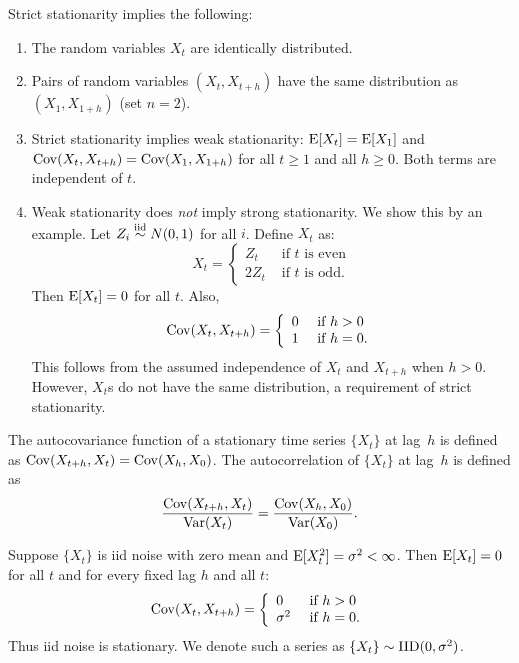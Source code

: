 Strict stationarity implies the following:
\begin{enumerate}
\item The random variables $X_t$ are identically distributed.
	
	\item Pairs of random variables $(X_t, X_{t + h})$ have the same
distribution as $(X_1, X_{1 + h})$ (set $n = 2$).
	
	\item Strict stationarity implies weak stationarity: $\operatorname{E}[X_t] =
\operatorname{E}[X_1]$ and $\operatorname{Cov}(X_t, X_{t + h}) = \operatorname{Cov}(X_1, X_{1 + h})$ for all $t \geq 1$
and all $h \geq 0$. Both terms are independent of $t$.
	
	\item Weak stationarity does \emph{not} imply strong stationarity. We
show this by an example. Let $Z_i \stackrel{\text{iid}}{\sim} N(0, 1)$ for all $i$. Define $X_t$ as:
\[ X_t = \left \{ \begin{array}{ll} Z_t   & \text{ if $t$ is even}\\ 
                                    2 Z_t & \text{ if $t$ is odd}.   
                  \end{array}	
         \right . 
\] 
Then $\operatorname{E}[X_t] = 0$ for all $t$. Also, 
\[
    \operatorname{Cov}(X_t, X_{t + h}) = \left \{ 
                                \begin{array}{ll}
                                    0 & \text{ if } h > 0 \\
                                    1 & \text{ if } h = 0.
                                \end{array}
                           \right . 
\]
This follows from the assumed independence of $X_t$ and $X_{t + h}$ when $h > 0$. 
However, $X_t$s do not have the same distribution, a requirement of 
strict stationarity.
\end{enumerate}

The autocovariance function of a stationary time series $\{ X_t \}$ at lag~$h$
is defined as $\operatorname{Cov}(X_{t + h}, X_{t}) = \operatorname{Cov}(X_{h}, X_{0})$. The autocorrelation
of $\{ X_t \}$ at lag~$h$ is defined as 
\[
	\frac{ \operatorname{Cov}(X_{t + h}, X_t) }{ \operatorname{Var}(X_t) } = 
	\frac{ \operatorname{Cov}( X_h, X_0 )}{ \operatorname{Var}(X_0) }.
\]   

\begin{example}
Suppose $\{ X_t \}$ is iid noise with zero mean and 
$\operatorname{E} [X_t^2] = \sigma^2 < \infty$. Then $\operatorname{E} [X_t] = 0$ for all $t$ and for every
fixed lag $h$ and all $t$:
\[\operatorname{Cov}(X_t, X_{t + h}) = \left \{ 
                                \begin{array}{ll}
                                    0        & \text{ if } h > 0 \\
                                    \sigma^2 & \text{ if } h = 0.
                                \end{array}
                          \right . 
\]
Thus iid noise is stationary. We denote such a series as 
$\{ X_t \} \sim \operatorname{IID} (0, \sigma^2)$.
\end{example}

